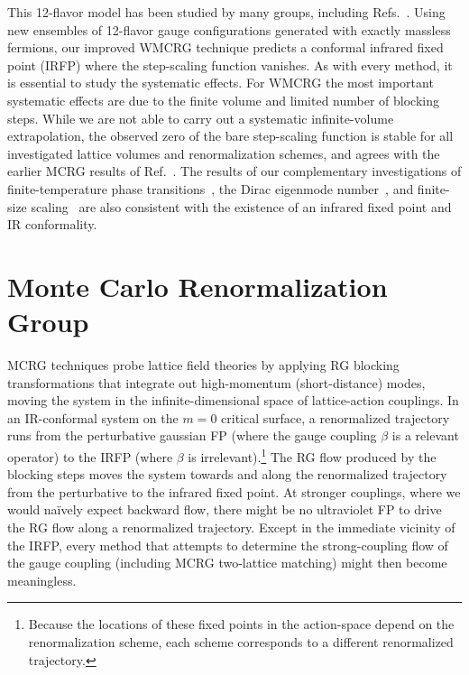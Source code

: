 \documentclass{PoS}
\newcommand{\be}{\ensuremath{\beta} }
\newcommand{\refcite}[1]{Ref.~\cite{#1}}
\begin{document}
This 12-flavor model has been studied by many groups, including Refs.~\cite{Appelquist:2009ty, Deuzeman:2009mh, Fodor:2011tu, Appelquist:2011dp, Hasenfratz:2011xn, DeGrand:2011cu, Cheng:2011ic, Jin:2012dw, Lin:2012iw, Aoki:2012eq, Fodor:2012uw, Fodor:2012et, Itou:2012qn, Cheng:2013eu, Aoki:2013pca, Hasenfratz:2013uha, Hasenfratz:2013eka, Cheng:2013bca}.
Using new ensembles of 12-flavor gauge configurations generated with exactly massless fermions, our improved WMCRG technique predicts a conformal infrared fixed point (IRFP) where the step-scaling function vanishes.
As with every method, it is essential to study the systematic effects.
For WMCRG the most important systematic effects are due to the finite volume and limited number of blocking steps.
While we are not able to carry out a systematic infinite-volume extrapolation, the observed zero of the bare step-scaling function is stable for all investigated lattice volumes and renormalization schemes, and agrees with the earlier MCRG results of \refcite{Hasenfratz:2011xn}.
The results of our complementary investigations of finite-temperature phase transitions~\cite{Schaich:2012fr, Hasenfratz:2013uha}, the Dirac eigenmode number~\cite{Cheng:2013eu, Cheng:2013bca}, and finite-size scaling~\cite{Hasenfratz:2013eka} are also consistent with the existence of an infrared fixed point and IR conformality.



\section{\label{sec:mcrg}Monte Carlo Renormalization Group} %
MCRG techniques probe lattice field theories by applying RG blocking transformations that integrate out high-momentum (short-distance) modes, moving the system in the infinite-dimensional space of lattice-action couplings.
In an IR-conformal system on the $m = 0$ critical surface, a renormalized trajectory runs from the perturbative gaussian FP (where the gauge coupling \be is a relevant operator) to the IRFP (where \be is irrelevant).\footnote{Because the locations of these fixed points in the action-space depend on the renormalization scheme, each scheme corresponds to a different renormalized trajectory.}
The RG flow produced by the blocking steps moves the system towards and along the renormalized trajectory from the perturbative to the infrared fixed point.
At stronger couplings, where we would na\"ively expect backward flow, there might be no ultraviolet FP to drive the RG flow along a renormalized trajectory.
Except in the immediate vicinity of the IRFP, every method that attempts to determine the strong-coupling flow of the gauge coupling (including MCRG two-lattice matching) might then become meaningless.
\end{document}
